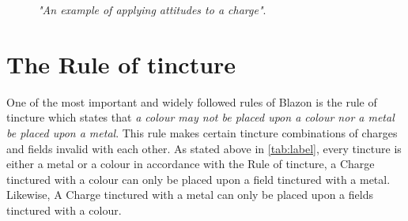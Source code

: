 \begin{figure}[H]
\hfill
{}
\hfill
\caption{\emph{"An example of applying attitudes to a charge"}.}

\end{figure}



\section{The Rule of tincture}
One of the most important and widely followed rules of Blazon is the rule of tincture which states that \emph{a colour may not be placed upon a colour nor a metal be placed upon a metal}\cite[p.46]{ruleoftincture}.  This rule makes certain tincture combinations of charges and fields invalid with each other.  As stated above in \ref{tab:label}, every tincture is either a metal or a colour in accordance with the Rule of tincture, a Charge tinctured with a colour can only be placed upon a field tinctured with a metal.  Likewise, A Charge tinctured with a metal can only be placed upon a fields tinctured with a colour.  

